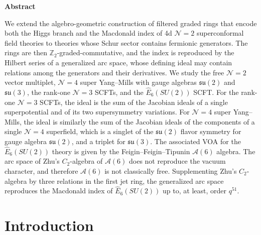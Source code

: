 \documentclass[12pt]{article}
\numberwithin{equation}{section}
\numberwithin{figure}{section}
\theoremstyle{plain}
\theoremstyle{definition}
\begin{document}
\begin{titlepage}
\begin{center}
\vspace{0.7cm}
%
\textbf{Abstract}
\end{center}
{
We extend the algebro-geometric construction of filtered graded rings that encode both the Higgs branch and the Macdonald index of 4d $\mathcal{N}=2$ superconformal field theories to theories whose Schur sector contains fermionic generators. The rings are then $\mathbb{Z}_2$-graded-commutative, and the index is reproduced by the Hilbert series of a generalized arc space, whose defining ideal may contain relations among the generators and their derivatives. We study the free $\mathcal{N}=2$ vector multiplet, $\mathcal{N}=4$ super Yang--Mills with gauge algebras $\mathfrak{su}(2)$ and $\mathfrak{su}(3)$, the rank-one $\mathcal{N}=3$ SCFTs, and the $\widehat{E}_6(SU(2))$ SCFT. For the rank-one $\mathcal{N}=3$ SCFTs, the ideal is the sum of the Jacobian ideals of a single superpotential and of its two supersymmetry variations. For $\mathcal{N}=4$ super Yang--Mills, the ideal is similarly the sum of the Jacobian ideals of the components of a single $\mathcal{N}=4$ superfield, which is a singlet of the $\mathfrak{su}(2)$ flavor symmetry for gauge algebra $\mathfrak{su}(2)$, and a triplet for $\mathfrak{su}(3)$. The associated VOA for the $\widehat{E}_6(SU(2))$ theory is given by the Feigin--Feigin--Tipunin $\mathcal{A}(6)$ algebra. The arc space of Zhu's $C_2$-algebra of $\mathcal{A}(6)$ does not reproduce the vacuum character, and therefore $\mathcal{A}(6)$ is not classically free. Supplementing Zhu's $C_2$-algebra by three relations in the first jet ring, the generalized arc space reproduces the Macdonald index of $\widehat{E}_6(SU(2))$ up to, at least, order $q^{51}$.
}
\vfill 
\end{titlepage}


\tableofcontents
\newpage

\section{Introduction}
\label{Intro}
\end{document}
